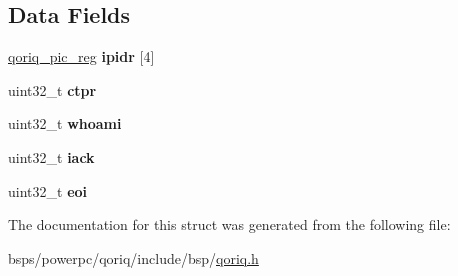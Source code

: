 \subsection*{Data Fields}
\begin{DoxyCompactItemize}
\item 
\mbox{\label{structqoriq__pic__per__cpu_a893d8949671d42b1d8d98cc3e3cd5125}} 
\mbox{\hyperlink{structqoriq__pic__reg}{qoriq\+\_\+pic\+\_\+reg}} {\bfseries ipidr} \mbox{[}4\mbox{]}
\item 
\mbox{\label{structqoriq__pic__per__cpu_a0e18a18733253103b02230edf9b90dc5}} 
uint32\+\_\+t {\bfseries ctpr}
\item 
\mbox{\label{structqoriq__pic__per__cpu_a01f461cdb61bd798e3d8271535c39700}} 
uint32\+\_\+t {\bfseries whoami}
\item 
\mbox{\label{structqoriq__pic__per__cpu_afba8423af5882538ea7affef468c314e}} 
uint32\+\_\+t {\bfseries iack}
\item 
\mbox{\label{structqoriq__pic__per__cpu_ad5704b83f9233dd1439dbe7375ed7f80}} 
uint32\+\_\+t {\bfseries eoi}
\end{DoxyCompactItemize}


The documentation for this struct was generated from the following file\+:\begin{DoxyCompactItemize}
\item 
bsps/powerpc/qoriq/include/bsp/\mbox{\hyperlink{qoriq_8h}{qoriq.\+h}}\end{DoxyCompactItemize}
